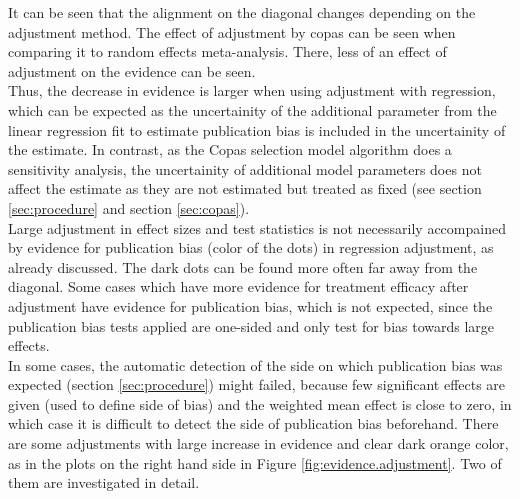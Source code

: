 \documentclass[11pt,a4paper,twoside]{book}\usepackage[]{graphicx}\usepackage[]{color}
\begin{document}


It can be seen that the alignment on the diagonal changes depending on the adjustment method. The effect of adjustment by copas can be seen when comparing it to random effects meta-analysis. There, less of an effect of adjustment on the evidence can be seen. \\
Thus, the decrease in evidence is larger when using adjustment with regression, which can be expected as the uncertainity of the additional parameter from the linear regression fit to estimate publication bias is included in the uncertainity of the estimate. In contrast, as the Copas selection model algorithm does a sensitivity analysis, the uncertainity of additional model parameters does not affect the estimate as they are not estimated but treated as fixed (see section \ref{sec:procedure} and section \ref{sec:copas}).\\
Large adjustment in effect sizes and test statistics is not necessarily accompained by evidence for publication bias (color of the dots) in regression adjustment, as already discussed. The dark dots can be found more often far away from the diagonal. Some cases which have more evidence for treatment efficacy after adjustment have evidence for publication bias, which is not expected, since the publication bias tests applied are one-sided and only test for bias towards large effects. \\
In some cases, the automatic detection of the side on which publication bias was expected (section \ref{sec:procedure}) might failed, because few significant effects are given (used to define side of bias) and the weighted mean effect is close to zero, in which case it is difficult to detect the side of publication bias beforehand. There are some adjustments with large increase in evidence and clear dark orange color, as in the plots on the right hand side in Figure \ref{fig:evidence.adjustment}. Two of them are investigated in detail. 
\end{document}
